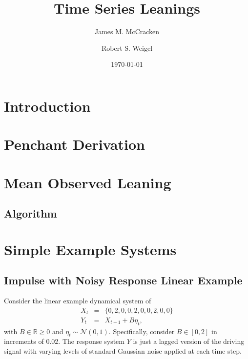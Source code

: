 \documentclass[twocolumn,aps,pre,groupedaddress]{revtex4-1}
\begin{document}
\title{Time Series Leanings}
\author{James M. McCracken}
\author{Robert S. Weigel}
\date{\today}

\begin{abstract}
\end{abstract}

\pacs{}
\maketitle

\section{Introduction}

\section{Penchant Derivation}

\section{Mean Observed Leaning}

\subsection{Algorithm}

\section{Simple Example Systems}

\subsection{Impulse with Noisy Response Linear Example}
Consider the linear example dynamical system of
\begin{eqnarray}
\label{eq:linearex1}
X_t &=& \{0,2,0,0,2,0,0,2,0,0\}\\
Y_t &=& X_{t-1}+B\eta_t,
\end{eqnarray}
with $B\in\mathbb{R}\ge 0$ and $\eta_t\sim\mathcal{N}\left(0,1\right)$.  Specifically, consider $B\in[0,2]$ in increments of 0.02.  The response system $Y$ is just a lagged version of the driving signal with varying levels of standard Gaussian noise applied at each time step.  
\end{document}
